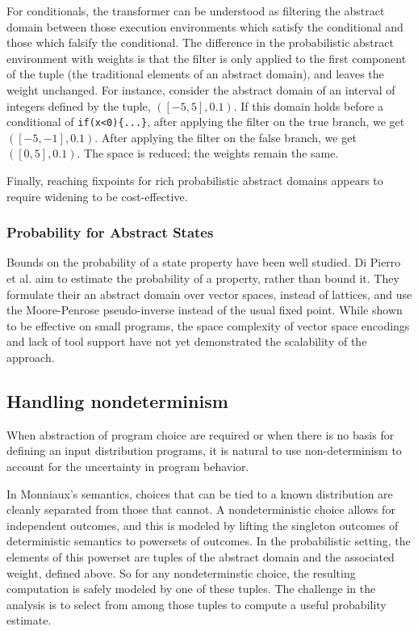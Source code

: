 For conditionals, the transformer can be understood
as filtering the abstract domain between those execution environments which
satisfy the conditional and those which falsify the conditional. 
The difference in the probabilistic abstract environment with weights 
is that the filter is only applied to the first component of
the tuple (the traditional elements of an abstract domain), 
and leaves the weight unchanged.
For instance, consider the abstract domain of an interval of 
integers defined by the tuple, $([-5,5],0.1)$. 
If this domain holds before a conditional of 
{\tt if(x<0)\{...\}}, after applying the filter on the true branch, 
we get $([-5,-1],0.1)$. 
After applying the filter on the false branch, we get $([0,5],0.1)$.
The space is reduced; the weights remain the same.

Finally, reaching fixpoints for rich probabilistic abstract domains
appears to require widening \cite{monniaux2000abstract,esparza2011probabilistic} to be cost-effective.

\subsubsection{Probability for Abstract States}




Bounds on the probability of a state property have been well studied.
Di Pierro et al. \cite{di2013probabilistic} aim to estimate the probability of a property,
rather than bound it.  They formulate their an abstract 
domain over vector spaces, instead of lattices, and use
the Moore-Penrose pseudo-inverse instead of the usual fixed point.
While shown to be effective on small programs, the space
complexity of vector space encodings and lack of tool support
have not yet demonstrated the scalability of the approach.


\subsection{Handling nondeterminism}
When abstraction of program choice are required or when 
there is no basis for defining an input distribution programs,
it is natural to use non-determinism to account for the uncertainty
in program behavior.

In Monniaux's semantics\cite{MonniauxMDP}, choices that can be tied to a known
distribution are cleanly separated from those that cannot.
A nondeterministic choice allows for independent outcomes, and
this is modeled by lifting the singleton outcomes of deterministic
semantics to powersets of outcomes.
In the probabilistic setting, the elements of this powerset are
tuples of the abstract domain and the associated weight, defined
above.  So for any nondeterminstic choice, the resulting computation 
is safely modeled by one of these tuples.  The challenge in the
analysis is to select from among those tuples to compute a useful
probability estimate.

